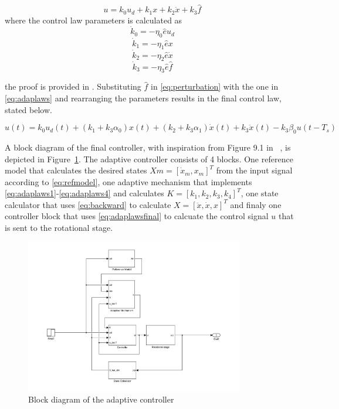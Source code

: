 \begin{equation}
  \label{eq:adaplaws}
  u = k_0u_d + k_1x + k_2\dot{x} + k_3\hat{f}
\end{equation}
where the control law parameters is calculated as
\begin{equation}
  \label{eq:adaplaws1}
  \dot{k}_0 = -\eta_0\hat{e}u_d
\end{equation}
\begin{equation}
  \label{eq:adaplaws2}
  \dot{k}_1 = -\eta_1\hat{e}x
\end{equation}
\begin{equation}
  \label{eq:adaplaws3}
  \dot{k}_2 = -\eta_2\hat{e}\dot{x}
\end{equation}
\begin{equation}
  \label{eq:adaplaws4}
  \dot{k}_3 = -\eta_3\hat{e}\hat{f}
\end{equation}

the proof is provided in \citep{Qingson:2016}. Substituting $\hat{f}$ in \eqref{eq:perturbation} with the one in \eqref{eq:adaplaws} and rearranging the parameters results in the final \abbrMRACPE control law, stated below.

\begin{equation}
    \label{eq:adaplawsfinal}
  u(t) = k_0u_d(t) + (k_1 + k_3\alpha_0)x(t) +  (k_2 + k_3\alpha_1)\dot{x}(t) + k_3\ddot{x}(t) - k_3\beta_0u(t-T_s)
\end{equation}

A block diagram of the final controller, with inspiration from Figure 9.1 in ~\citep{Qingson:2016}, is depicted in Figure~\ref{fig:adaptive}. The adaptive controller consists of 4 blocks. One reference model that calculates the desired states $Xm=[\dot{x}_m, x_m]^T$ from the input signal according to \eqref{eq:refmodel}, one adaptive mechanism that implements \eqref{eq:adaplaws1}-\eqref{eq:adaplaws4} and calculates $K=[k_1, k_2, k_3, k_4]^T$, one state calculator that uses \eqref{eq:backward} to calculate $X=[\ddot{x}, \dot{x}, x]^T$ and finaly one controller block that uses \eqref{eq:adaplawsfinal} to calcuate the control signal $u$ that is sent to the rotational stage.

\begin{figure}[h]
  \centering %
  \includegraphics[width=0.85\textwidth, trim=5cm 0cm 3.8cm 0cm, clip=true]{fig/matlab/adaptive_scheme}
  \caption{\label{fig:adaptive}Block diagram of the adaptive controller}
\end{figure}

